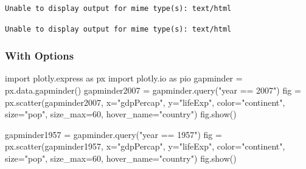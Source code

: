 \documentclass[
  letterpaper,
  DIV=11,
  numbers=noendperiod,
  oneside]{scrartcl}
\newenvironment{Shaded}{\begin{snugshade}}{\end{snugshade}}
\newcommand{\DecValTok}[1]{\textcolor[rgb]{0.68,0.00,0.00}{#1}}
\newcommand{\ImportTok}[1]{\textcolor[rgb]{0.00,0.46,0.62}{#1}}
\newcommand{\NormalTok}[1]{\textcolor[rgb]{0.00,0.23,0.31}{#1}}
\newcommand{\OperatorTok}[1]{\textcolor[rgb]{0.37,0.37,0.37}{#1}}
\newcommand{\StringTok}[1]{\textcolor[rgb]{0.13,0.47,0.30}{#1}}
\begin{document}
\begin{verbatim}
Unable to display output for mime type(s): text/html
\end{verbatim}

\begin{verbatim}
Unable to display output for mime type(s): text/html
\end{verbatim}

\hypertarget{with-options}{%
\subsubsection{With Options}\label{with-options}}

\begin{Shaded}
\begin{Highlighting}[]
\ImportTok{import}\NormalTok{ plotly.express }\ImportTok{as}\NormalTok{ px}
\ImportTok{import}\NormalTok{ plotly.io }\ImportTok{as}\NormalTok{ pio}
\NormalTok{gapminder }\OperatorTok{=}\NormalTok{ px.data.gapminder()}
\NormalTok{gapminder2007 }\OperatorTok{=}\NormalTok{ gapminder.query(}\StringTok{"year == 2007"}\NormalTok{)}
\NormalTok{fig }\OperatorTok{=}\NormalTok{ px.scatter(gapminder2007, }
\NormalTok{                 x}\OperatorTok{=}\StringTok{"gdpPercap"}\NormalTok{, y}\OperatorTok{=}\StringTok{"lifeExp"}\NormalTok{, color}\OperatorTok{=}\StringTok{"continent"}\NormalTok{, }
\NormalTok{                 size}\OperatorTok{=}\StringTok{"pop"}\NormalTok{, size\_max}\OperatorTok{=}\DecValTok{60}\NormalTok{,}
\NormalTok{                 hover\_name}\OperatorTok{=}\StringTok{"country"}\NormalTok{)}
\NormalTok{fig.show()}

\NormalTok{gapminder1957 }\OperatorTok{=}\NormalTok{ gapminder.query(}\StringTok{"year == 1957"}\NormalTok{)}
\NormalTok{fig }\OperatorTok{=}\NormalTok{ px.scatter(gapminder1957, }
\NormalTok{                 x}\OperatorTok{=}\StringTok{"gdpPercap"}\NormalTok{, y}\OperatorTok{=}\StringTok{"lifeExp"}\NormalTok{, color}\OperatorTok{=}\StringTok{"continent"}\NormalTok{, }
\NormalTok{                 size}\OperatorTok{=}\StringTok{"pop"}\NormalTok{, size\_max}\OperatorTok{=}\DecValTok{60}\NormalTok{,}
\NormalTok{                 hover\_name}\OperatorTok{=}\StringTok{"country"}\NormalTok{)}
\NormalTok{fig.show()}
\end{Highlighting}
\end{Shaded}
\end{document}
